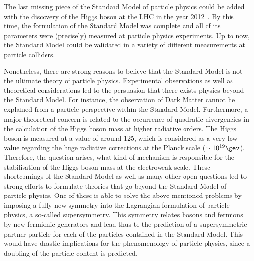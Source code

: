 The last missing piece of the Standard Model of particle physics could be added with the discovery of the Higgs boson at the LHC in the year 2012~\cite{bib:Theory:CMS:HiggsObservation,bib:Theory:Atlas:HiggsObservation}.
By this time, the formulation of the Standard Model was complete and all of its parameters were (precisely) measured at particle physics experiments. 
Up to now, the Standard Model could be validated in a variety of different measurements at particle colliders.

Nonetheless, there are strong reasons to believe that the Standard Model is not the ultimate theory of particle physics.
Experimental observations as well as theoretical considerations led to the persuasion that there exists physics beyond the Standard Model.
For instance, the observation of Dark Matter cannot be explained from a particle perspective within the Standard Model.
Furthermore, a major theoretical concern is related to the occurrence of quadratic divergencies in the calculation of the Higgs boson mass at higher radiative orders.
The Higgs boson is measured at a value of around 125\gev, which is considered as a very low value regarding the huge radiative corrections at the Planck scale ($\sim 10^{19}\gev$). 
Therefore, the question arises, what kind of mechanism is responsible for the stabilisation of the Higgs boson mass at the electroweak scale. 
These shortcomings of the Standard Model as well as many other open questions led to strong efforts to formulate theories that go beyond the Standard Model of particle physics. 
One of these is able to solve the above mentioned problems by imposing a fully new symmetry into the Lagrangian formulation of particle physics, a so-called supersymmetry.
This symmetry relates bosons and fermions by new fermionic generators and lead thus to the prediction of a supersymmetric partner particle for each of the particles contained in the Standard Model.
This would have drastic implications for the phenomenology of particle physics, since a doubling of the particle content is predicted.


